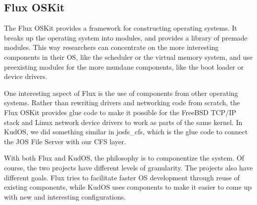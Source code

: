 \subsection{Flux OSKit}
\label{sec:related:flux}

The Flux OSKit \cite{ford97oskit} provides a framework for constructing
operating systems. It breaks up the operating system into modules, and provides
a library of premade modules. This way researchers can concentrate on the more
interesting components in their OS, like the scheduler or the virtual memory
system, and use preexisting modules for the more mundane components, like the
boot loader or device drivers.

One interesting aspect of Flux is the use of components from other operating
systems. Rather than rewriting drivers and networking code from scratch, the
Flux OSKit provides glue code to make it possible for the FreeBSD TCP/IP stack
and Linux network device drivers to work as parts of the same kernel. In KudOS,
we did something similar in josfs\_cfs, which is the glue code to connect the
JOS File Server with our CFS layer.

With both Flux and KudOS, the philosophy is to componentize the system. Of
course, the two projects have different levels of granularity. The projects also
have different goals. Flux tries to facilitate faster OS development through
reuse of existing components, while KudOS uses components to make it easier to
come up with new and interesting configurations.
